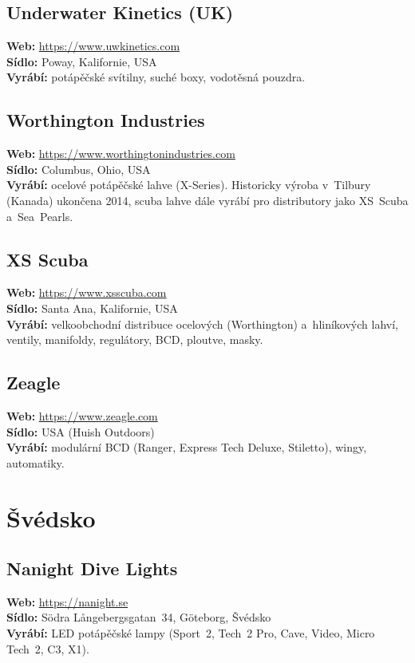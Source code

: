 \documentclass[11pt,a4paper]{article}
\begin{document}
\subsection{Underwater Kinetics (UK)}
\textbf{Web:} \url{https://www.uwkinetics.com} \\
\textbf{Sídlo:} Poway, Kalifornie, USA \\
\textbf{Vyrábí:} potápěčské svítilny, suché boxy, vodotěsná pouzdra.

\subsection{Worthington Industries}
\textbf{Web:} \url{https://www.worthingtonindustries.com} \\
\textbf{Sídlo:} Columbus, Ohio, USA \\
\textbf{Vyrábí:} ocelové potápěčské lahve (X-Series). Historicky výroba v~Tilbury (Kanada) ukončena 2014, scuba lahve dále vyrábí pro distributory jako XS~Scuba a~Sea~Pearls.

\subsection{XS Scuba}
\textbf{Web:} \url{https://www.xsscuba.com} \\
\textbf{Sídlo:} Santa Ana, Kalifornie, USA \\
\textbf{Vyrábí:} velkoobchodní distribuce ocelových (Worthington) a~hliníkových lahví, ventily, manifoldy, regulátory, BCD, ploutve, masky.

\subsection{Zeagle}
\textbf{Web:} \url{https://www.zeagle.com} \\
\textbf{Sídlo:} USA (Huish Outdoors) \\
\textbf{Vyrábí:} modulární BCD (Ranger, Express Tech Deluxe, Stiletto), wingy, automatiky.

\section{Švédsko}

\subsection{Nanight Dive Lights}
\textbf{Web:} \url{https://nanight.se} \\
\textbf{Sídlo:} Södra Långebergsgatan~34, Göteborg, Švédsko \\
\textbf{Vyrábí:} LED potápěčské lampy (Sport~2, Tech~2 Pro, Cave, Video, Micro Tech~2, C3, X1).
\end{document}
